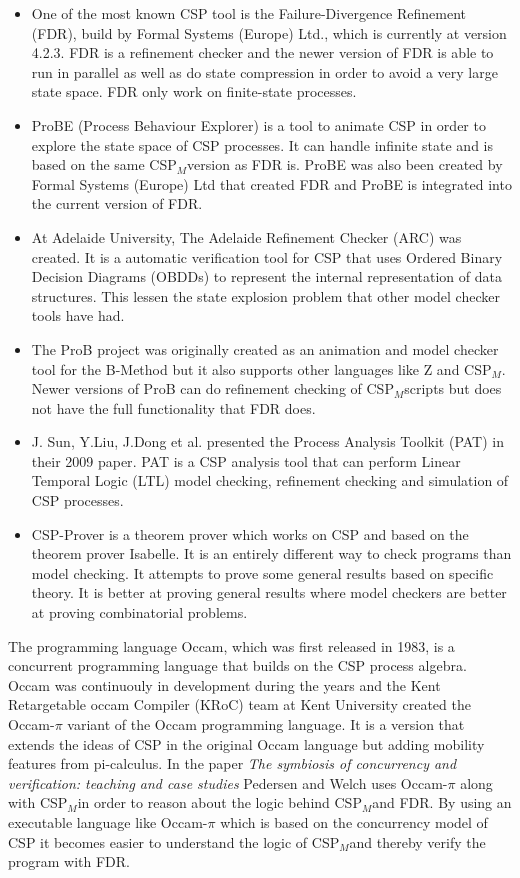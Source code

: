 \documentclass[a4paper]{report}
\newcommand{\cspm}{CSP$_M$}
\begin{document}
\begin{itemize}
\item One of the most known CSP tool is the Failure-Divergence Refinement (FDR), build by Formal Systems (Europe) Ltd., which is currently at version 4.2.3\cite{fdr}. FDR is a refinement checker and the newer version of FDR is able to run in parallel as well as do state compression in order to avoid a very large state space. FDR only work on finite-state processes. 
\item ProBE (Process Behaviour Explorer)\cite{probe} is a tool to animate CSP in order to explore the state space of CSP processes. It can handle infinite state and is based on the same \cspm version as FDR is. ProBE was also been created by Formal Systems (Europe) Ltd that created FDR and ProBE is integrated into the current version of FDR. 
\item At Adelaide University, The Adelaide Refinement Checker (ARC)\cite{Parashkevov1996} was created. It is a automatic verification tool for CSP that uses Ordered Binary Decision Diagrams (OBDDs) to represent the internal representation of data structures. This lessen the state explosion problem that other model checker tools have had. 
\item The ProB project\cite{ProB}\cite{Leuschel2003} was originally created as an animation and model checker tool for the B-Method\cite{Abrial1988} but it also supports other languages like Z and \cspm. Newer versions of ProB can do refinement checking of \cspm scripts but does not have the full functionality that FDR does.
\item J. Sun, Y.Liu, J.Dong et al. presented the Process Analysis Toolkit (PAT) in their 2009 paper\cite{Sun2009}. PAT is a CSP analysis tool that can perform Linear Temporal Logic (LTL) model checking, refinement checking and simulation of CSP processes.
\item CSP-Prover\cite{Isobe2005} is a theorem prover which works on CSP and based on the theorem prover Isabelle. It is an entirely different way to check programs than model checking. It attempts to prove some general results based on specific theory. It is better at proving general results where model checkers are better at proving combinatorial problems.
\end{itemize}
The programming language Occam\cite{Occam1995}, which was first released in 1983, is a concurrent programming language that builds on the CSP process algebra. Occam was continuouly in development during the years and the Kent Retargetable occam Compiler (KRoC) team at Kent University created the Occam-$\pi$\cite{UniveristyofKent} variant of the Occam programming language. It is a version that extends the ideas of CSP in the original Occam language but adding mobility features from pi-calculus. In the paper \textit{The symbiosis of concurrency and verification: teaching and case studies}\cite{Pedersen2018} Pedersen and Welch uses Occam-$\pi$ along with \cspm in order to reason about the logic behind \cspm and FDR. By using an executable language like Occam-$\pi$ which is based on the concurrency model of CSP it becomes easier to understand the logic of \cspm and thereby verify the program with FDR.\\\\
\end{document}
